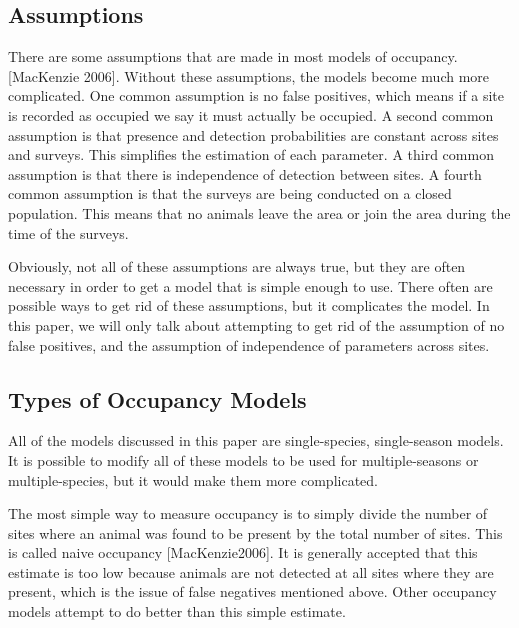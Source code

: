 \documentclass{article}
\begin{document}
	\subsection{Assumptions}

	There are some assumptions that are made in most models of occupancy.  [MacKenzie 2006].
Without these assumptions, the models become much more complicated.  One 
common assumption is no false positives, which means if a site is recorded as
occupied we say it must actually be occupied.  A second common assumption is that
presence and detection probabilities are constant across sites and surveys.  This 
simplifies the estimation of each parameter.  A third common assumption is that 
there is independence of detection between sites.  A fourth common assumption is 
that the surveys are being conducted on a closed population.  This means that no 
animals leave the area or join the area during the time of the surveys.  

	Obviously, not all of these assumptions are always true, but they are often 
necessary in order to get a model that is simple enough to use.  There often are
possible ways to get rid of these assumptions, but it complicates the model.  In
this paper, we will only talk about attempting to get rid of the assumption of no
false positives, and the assumption of independence of parameters across sites.

	\subsection{Types of Occupancy Models}

		All of the models discussed in this paper are single-species, single-season
models.  It is possible to modify all of these models to be used for multiple-seasons
or multiple-species, but it would make them more complicated.  

	The most simple way to measure occupancy is to simply divide the number 
of sites where an animal was found to be present by the total number of sites.  
This is called naive occupancy [MacKenzie2006].  It is generally accepted that 
this estimate is too low because animals are not detected at all sites where they
are present, which is the issue of false negatives mentioned above.  Other 
occupancy models attempt to do better than this simple estimate.
\end{document}
